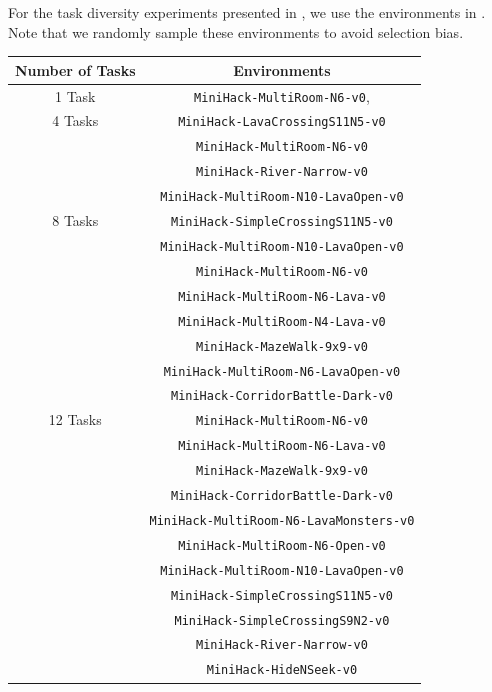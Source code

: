 \documentclass[]{fairmeta}
\begin{document}
For the task diversity experiments presented in , we use the environments in . Note that we randomly sample these environments to avoid selection bias.
\begin{table}[!ht]
\centering
\begin{tabular}{c c }
\hline
\textbf{Number of Tasks} & \textbf{Environments} \\
\hline
1 Task  & \texttt{MiniHack-MultiRoom-N6-v0},  \\
\hline
4 Tasks & \texttt{MiniHack-LavaCrossingS11N5-v0} \\
        & \texttt{MiniHack-MultiRoom-N6-v0}\\
        & \texttt{MiniHack-River-Narrow-v0}\\
        & \texttt{MiniHack-MultiRoom-N10-LavaOpen-v0} \\
\hline
8 Tasks &  \texttt{MiniHack-SimpleCrossingS11N5-v0} \\
        & \texttt{MiniHack-MultiRoom-N10-LavaOpen-v0}\\
        &  \texttt{MiniHack-MultiRoom-N6-v0} \\
        & \texttt{MiniHack-MultiRoom-N6-Lava-v0} \\
        &  \texttt{MiniHack-MultiRoom-N4-Lava-v0} \\
        &  \texttt{MiniHack-MazeWalk-9x9-v0} \\
        &   \texttt{MiniHack-MultiRoom-N6-LavaOpen-v0} \\
        &\texttt{MiniHack-CorridorBattle-Dark-v0} \\
\hline
12 Tasks & \texttt{MiniHack-MultiRoom-N6-v0}\\
        & \texttt{MiniHack-MultiRoom-N6-Lava-v0} \\
        &  \texttt{MiniHack-MazeWalk-9x9-v0}\\
        &\texttt{MiniHack-CorridorBattle-Dark-v0}\\
        &  \texttt{MiniHack-MultiRoom-N6-LavaMonsters-v0}\\
        &\texttt{MiniHack-MultiRoom-N6-Open-v0} \\
        &  \texttt{MiniHack-MultiRoom-N10-LavaOpen-v0} \\
        &\texttt{MiniHack-SimpleCrossingS11N5-v0} \\
        &  \texttt{MiniHack-SimpleCrossingS9N2-v0} \\
        &\texttt{MiniHack-River-Narrow-v0} \\
        &  \texttt{MiniHack-HideNSeek-v0} \\

\end{tabular}
\end{table}
\end{document}
